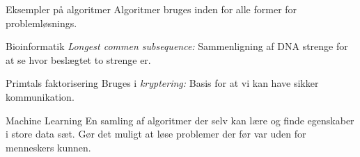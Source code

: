 \documentclass[12pt,t]{beamer}
\begin{document}
    \begin{frame}[t]{Eksempler på algoritmer}
        Algoritmer bruges inden for alle former for problemløsnings. \pause
        \begin{block}{Bioinformatik}
            \emph{Longest commen subsequence: } Sammenligning af DNA strenge
            for at se hvor beslægtet to strenge er. \pause
        \end{block}
        \begin{block}{Primtals faktorisering}
            Bruges i \emph{kryptering: } Basis for at vi kan have sikker
            kommunikation. \pause
        \end{block}

        \begin{block}{Machine Learning}
            En samling af algoritmer der selv kan lære og finde egenskaber
            i store data sæt. Gør det muligt at løse problemer der før var
            uden for menneskers kunnen.
        \end{block}
    \end{frame}
\end{document}
